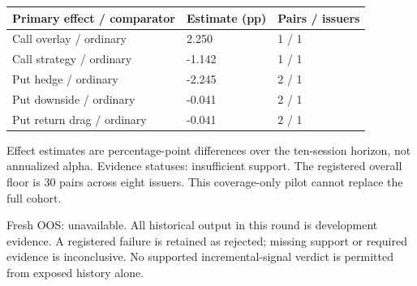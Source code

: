 \documentclass[11pt,letterpaper]{article}
\begin{document}
\begin{tabular}{@{}p{}p{}p{}@{}}
\toprule
\textbf{Primary effect / comparator} & \textbf{Estimate (pp)} & \textbf{Pairs / issuers} \\
\midrule
Call overlay / ordinary & 2.250 & 1 / 1 \\
Call strategy / ordinary & -1.142 & 1 / 1 \\
Put hedge / ordinary & -2.245 & 2 / 1 \\
Put downside / ordinary & -0.041 & 2 / 1 \\
Put return drag / ordinary & -0.041 & 2 / 1 \\
\bottomrule
\end{tabular}
\par\smallskip
Effect estimates are percentage-point differences over the ten-session horizon, not annualized alpha. Evidence statuses: insufficient support. The registered overall floor is 30 pairs across eight issuers. This coverage-only pilot cannot replace the full cohort.

Fresh OOS: unavailable. All historical output in this round is development evidence. A registered failure is retained as rejected; missing support or required evidence is inconclusive. No supported incremental-signal verdict is permitted from exposed history alone.


\clearpage
\end{document}
